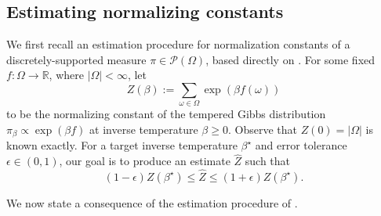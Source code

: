 \documentclass[11pt]{article}
\newcommand{\defeq}{:=}
\newcommand{\eps}{\epsilon}
\newcommand{\R}{\mathbb{R}}
\newcommand{\1}{\mathbf{1}}
\newcommand{\0}{\mathbf{0}}
\newcommand{\calP}{{\mathcal{P}}}
\newcommand{\hZ}{\widehat{Z}}
\begin{document}
\subsection{Estimating normalizing constants}
\label{ssec:est_normalizing_const}

We first recall an estimation procedure for normalization constants of a discretely-supported measure $\pi \in \calP(\Omega)$, based directly on \cite{Kolmogorov18}. For some fixed $f: \Omega \to \R$, where $|\Omega| < \infty$, let
\begin{equation}\label{eq:Zdef}
Z(\beta) \defeq \sum_{\omega \in \Omega} \exp(\beta f(\omega))
\end{equation}
to be the normalizing constant 
of the tempered Gibbs distribution $\pi_{\beta} \propto \exp(\beta f)$ at inverse temperature $\beta \ge 0$. Observe that $Z(0) = |\Omega|$ is known exactly. For a target inverse temperature $\beta^\star$ and error tolerance $\eps \in (0, 1)$, our goal is to produce an estimate $\hZ$ such that
\begin{equation}\label{eq:Zgoal}(1 - \eps)Z(\beta^\star)\le \hZ \le (1 + \eps)Z(\beta^\star).\end{equation}

We now state a consequence of the estimation procedure of \cite{Kolmogorov18}.
\end{document}
